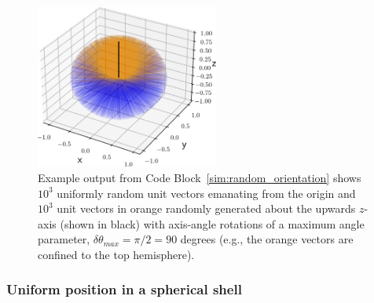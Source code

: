 \documentclass[
  9pt,
  bestpractices,
]{livecoms}
\begin{document}
%

\begin{figure}

\end{figure}

\begin{figure}

\end{figure}

\begin{figure}
\begin{centering}
\includegraphics[width=6cm]{../figures/random_orientation.png}
\caption{
  Example output from Code Block~\ref{sim:random_orientation} shows $10^3$ uniformly random unit vectors emanating from the origin and $10^3$ unit vectors in orange randomly generated about the upwards $z$-axis (shown in black) with axis-angle rotations of a maximum angle parameter, $\delta \theta_{max}=\pi/2=90$ degrees (e.g., the orange vectors are confined to the top hemisphere).
\label{fig:random_orientation}
}
\end{centering}
\end{figure}

\subsubsection{\label{sec:spherical_shell}Uniform position in a spherical shell}
\end{document}
